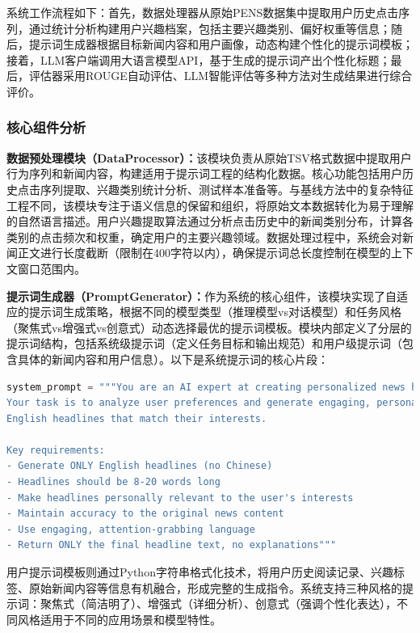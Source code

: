 \documentclass[10pt,a4paper]{article}
\begin{document}
系统工作流程如下：首先，数据处理器从原始PENS数据集中提取用户历史点击序列，通过统计分析构建用户兴趣档案，包括主要兴趣类别、偏好权重等信息；随后，提示词生成器根据目标新闻内容和用户画像，动态构建个性化的提示词模板；接着，LLM客户端调用大语言模型API，基于生成的提示词产出个性化标题；最后，评估器采用ROUGE自动评估、LLM智能评估等多种方法对生成结果进行综合评价。

\subsubsection{核心组件分析}
\textbf{数据预处理模块（DataProcessor）：}该模块负责从原始TSV格式数据中提取用户行为序列和新闻内容，构建适用于提示词工程的结构化数据。核心功能包括用户历史点击序列提取、兴趣类别统计分析、测试样本准备等。与基线方法中的复杂特征工程不同，该模块专注于语义信息的保留和组织，将原始文本数据转化为易于理解的自然语言描述。用户兴趣提取算法通过分析点击历史中的新闻类别分布，计算各类别的点击频次和权重，确定用户的主要兴趣领域。数据处理过程中，系统会对新闻正文进行长度截断（限制在400字符以内），确保提示词总长度控制在模型的上下文窗口范围内。

\textbf{提示词生成器（PromptGenerator）：}作为系统的核心组件，该模块实现了自适应的提示词生成策略，根据不同的模型类型（推理模型vs对话模型）和任务风格（聚焦式vs增强式vs创意式）动态选择最优的提示词模板。模块内部定义了分层的提示词结构，包括系统级提示词（定义任务目标和输出规范）和用户级提示词（包含具体的新闻内容和用户信息）。以下是系统提示词的核心片段：

\begin{lstlisting}[language=Python, caption=系统提示词示例]
system_prompt = """You are an AI expert at creating personalized news headlines. 
Your task is to analyze user preferences and generate engaging, personalized 
English headlines that match their interests.

Key requirements:
- Generate ONLY English headlines (no Chinese)
- Headlines should be 8-20 words long
- Make headlines personally relevant to the user's interests
- Maintain accuracy to the original news content
- Use engaging, attention-grabbing language
- Return ONLY the final headline text, no explanations"""
\end{lstlisting}

用户提示词模板则通过Python字符串格式化技术，将用户历史阅读记录、兴趣标签、原始新闻内容等信息有机融合，形成完整的生成指令。系统支持三种风格的提示词：聚焦式（简洁明了）、增强式（详细分析）、创意式（强调个性化表达），不同风格适用于不同的应用场景和模型特性。
\end{document}
